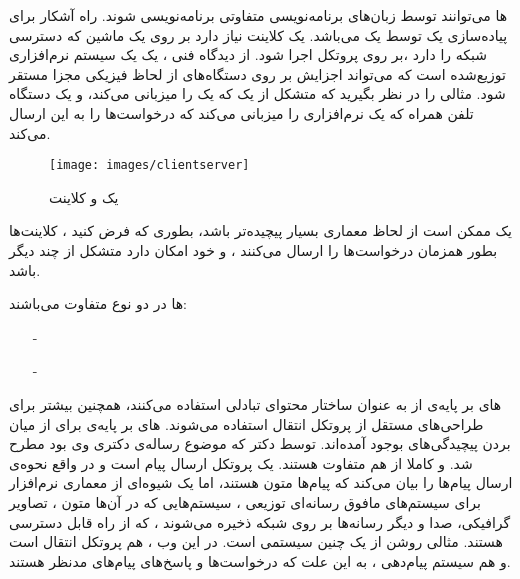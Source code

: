 \documentclass[oneside]{report}
\begin{document}
		{\normalsize{}} ها
		می‌توانند توسط زبان‌های برنامه‌نویسی متفاوتی برنامه‌نویسی شوند. راه آشکار برای پیاده‌سازی یک 
		{\normalsize{}}
		توسط یک 
		{\normalsize{}}
		می‌باشد. یک کلاینت 
		{\normalsize{}}
	نیاز دارد بر روی یک ماشین که دسترسی شبکه را دارد ،بر روی پروتکل
			{\normalsize{}}
			اجرا شود. از دیدگاه فنی ، یک
					{\normalsize{}} 
			یک سیستم نرم‌افزاری توزیع‌شده است که می‌تواند اجزایش بر روی دستگاه‌های از لحاظ فیزیکی مجزا مستقر شود. 
			مثالی را در نظر بگیرید که متشکل از یک 
					{\normalsize{}}
	که یک 
			{\normalsize{}}
			را میزبانی می‌کند، و یک دستگاه تلفن همراه که یک نرم‌افزاری را میزبانی می‌کند که درخواست‌ها را به این 
					{\normalsize{}}
					ارسال می‌‌کند. 
					\begin{figure}[h]
						\centering
						\texttt{[image: images/clientserver]}
						\caption{یک {\footnotesize{}} و کلاینت}
						\label{fig:clientserver}
					\end{figure}
یک 
		{\normalsize{}}
		ممکن است از لحاظ معماری بسیار پیچیده‌تر باشد، بطوری که فرض کنید ، کلاینت‌ها بطور همزمان درخواست‌ها را ارسال می‌کنند ، و خود 
				{\normalsize{}}
				امکان دارد متشکل از چند 
						{\normalsize{}}
						دیگر باشد. 					
					
{\normalsize{}}ها 
در دو نوع متفاوت می‌باشند: 
\begin{itemize}
	\item[-] {\normalsize{}}
	\item[-]{\normalsize{}}
\end{itemize}
{\normalsize{}} های 
بر پایه‌ی 
{\normalsize{}}
از 
{\normalsize{}}
به عنوان ساختار محتوای تبادلی استفاده می‌کنند، همچنین بیشتر برای طراحی‌های مستقل از پروتکل انتقال استفاده‌ می‌شوند. 
{\normalsize{}} های 
بر پایه‌ی 
{\normalsize{}}
برای از میان بردن پیچیدگی‌های 
{\normalsize{}}
بوجود آمده‌اند.
{\normalsize{}}
توسط دکتر 
{\normalsize{}}
که موضوع رساله‌ی دکتری وی بود مطرح شد. 
{\normalsize{}}
و 
{\normalsize{}}
کاملا از هم متفاوت هستند. 
{\normalsize{}}
یک پروتکل ارسال پیام است و در واقع نحوه‌ی ارسال پیام‌‌ها را بیان می‌کند که پیام‌ها متون 
{\normalsize{}}
هستند، اما 
{\normalsize{}}
یک شیوه‌ای از معماری نرم‌افزار برای سیستم‌های مافوق رسانه‌ای توزیعی 
، سیستم‌هایی که در آن‌ها متون ، تصاویر گرافیکی، صدا و دیگر رسانه‌ها بر روی شبکه ذخیره می‌شوند ، که از راه 
{\normalsize{}}
قابل دسترسی هستند. 
{\normalsize{}}
مثالی روشن از یک چنین سیستمی است. در این وب ، 
{\normalsize{}}
هم پروتکل انتقال است و هم سیستم پیام‌دهی ، به این علت که درخواست‌ها 
و پاسخ‌های 
پیام‌های مدنظر هستند.
\end{document}
